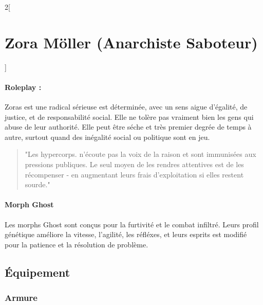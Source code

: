 \documentclass[a4paper,9pt]{article}
\begin{document}
\begin{multicols}{2}[\section*{Zora Möller (Anarchiste Saboteur)}]
   \paragraph{Roleplay :} Zoras est une radical sérieuse est déterminée, avec un sens aigue
   d'égalité, de justice, et de responsabilité social.
   Elle ne tolère pas vraiment bien les gens qui abuse de leur authorité.
   Elle peut être séche et très premier degrée de temps à autre, surtout quand des
   inégalité social ou politique sont en jeu.

   \begin{quote}
      "Les hypercorps. n'écoute pas la voix de la raison et sont immunisées aux
      pressions publiques. Le seul moyen de les rendres attentives est de les
      récompenser - en augmentant leurs frais d'exploitation si elles restent sourde."
   \end{quote}

   \paragraph{Morph Ghost}
   Les morphs Ghost sont conçus pour la furtivité et le combat infiltré.
   Leurs profil génétique améliore la vitesse, l'agilité, les réfléxes, et
   leurs esprits est modifié pour la patience et la résolution de problème.

   \subsection*{Équipement}

   \subsubsection*{Armure}

\end{multicols}
\end{document}
